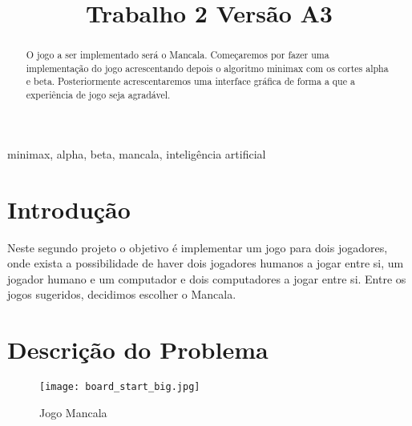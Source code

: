 \documentclass[conference]{IEEEtran}
\begin{document}
\title{Trabalho 2 Vers\~ao A3\\
}

\author{
\and
{}
}

\maketitle

\begin{abstract}
O jogo a ser implementado ser\'a o Mancala. Começaremos por fazer uma implementaç\~ao do jogo acrescentando depois o algoritmo minimax com os cortes alpha e beta. Posteriormente acrescentaremos uma interface gr\'afica de forma a que a experi\^encia de jogo seja agrad\'avel.
\end{abstract}

\begin{IEEEkeywords}
minimax, alpha, beta, mancala, intelig\^encia artificial
\end{IEEEkeywords}

\section{Introdu\c c\~ao}

Neste segundo projeto o objetivo \'e implementar um jogo para dois jogadores, onde exista a possibilidade de haver dois jogadores humanos a jogar entre si, um jogador humano e um computador e dois computadores a jogar entre si.
Entre os jogos sugeridos, decidimos escolher o Mancala. 


\section{Descri\c c\~ao do Problema}

\begin{figure}[htbp]
    \centerline{\texttt{[image: board\_start\_big.jpg]}}
    \caption{Jogo Mancala}
    \label{img}
\end{figure}
\end{document}
